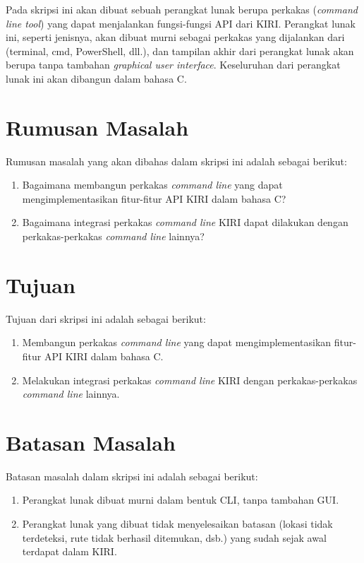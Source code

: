 Pada skripsi ini akan dibuat sebuah perangkat lunak berupa perkakas \cl (\textit{command line tool}) yang dapat menjalankan fungsi-fungsi API dari KIRI. Perangkat lunak ini, seperti jenisnya, akan dibuat murni sebagai perkakas yang dijalankan dari \cl (terminal, cmd, PowerShell, dll.), dan tampilan akhir dari perangkat lunak akan berupa \cli tanpa tambahan \textit{graphical user interface}. Keseluruhan dari perangkat lunak ini akan dibangun dalam bahasa C.

\section{Rumusan Masalah}
\label{sec:rumusan}
Rumusan masalah yang akan dibahas dalam skripsi ini adalah sebagai berikut:
\begin{enumerate}
	\item Bagaimana membangun perkakas \textit{command line} yang dapat mengimplementasikan fitur-fitur API KIRI dalam bahasa C?
	\item Bagaimana integrasi perkakas \textit{command line} KIRI dapat dilakukan dengan perkakas-perkakas \textit{command line} lainnya?
\end{enumerate}

\section{Tujuan}
\label{sec:tujuan}
Tujuan dari skripsi ini adalah sebagai berikut:
\begin{enumerate}
	\item Membangun perkakas \textit{command line} yang dapat mengimplementasikan fitur-fitur API KIRI dalam bahasa C.
	\item Melakukan integrasi perkakas \textit{command line} KIRI dengan perkakas-perkakas \textit{command line} lainnya.
\end{enumerate}

\section{Batasan Masalah}
\label{sec:batasan}
Batasan masalah dalam skripsi ini adalah sebagai berikut:
\begin{enumerate}
	\item Perangkat lunak dibuat murni dalam bentuk CLI, tanpa tambahan GUI.
	\item Perangkat lunak yang dibuat tidak menyelesaikan batasan (lokasi tidak terdeteksi, rute tidak berhasil ditemukan, dsb.) yang sudah sejak awal terdapat dalam KIRI.
\end{enumerate}

